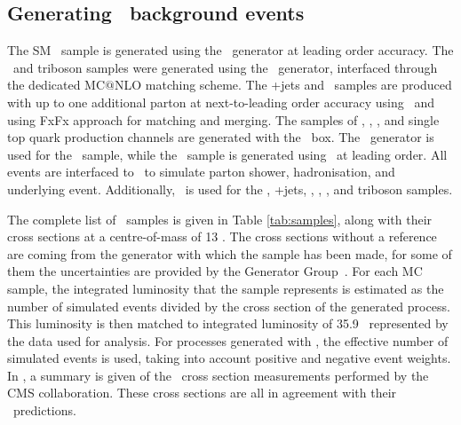\newpage
\subsection{Generating \SM\  background events}

The SM \tZq\ sample is generated using the \aMCMG\ generator at leading order accuracy. The \ttZ\ and triboson samples were generated using the \aMCMG\ generator, interfaced through the dedicated MC${@}$NLO matching scheme. The \WZ+jets and \ttW\ samples are produced with up to one additional parton at next-to-leading order accuracy using \aMCMG\ and using FxFx approach for matching and merging. The samples of \ttH, \WW, \ZZ,  and single top quark  production channels are generated with the \Powheg\ box. The \JHU\ generator is used for the \tqH\ sample, while the \tWZ\ sample is generated using \aMCMG\ at leading order. All events are interfaced to \Pythia\ to simulate parton shower, hadronisation, and underlying event. Additionally, \MS\ is used for the \tZq, \WZ+jets, \ttZ, \ttW, \tWZ, and triboson samples.



The complete list of \SM\ samples is given in Table \ref{tab:samples}, along with their cross sections at a centre-of-mass of 13 \TeV. The cross sections without a reference are coming from the generator with which the sample has been made, for some of them the uncertainties are provided by the Generator Group~\cite{generator}. For each MC sample, the integrated luminosity that the sample represents is estimated as the number of simulated events divided by the cross section of the generated process. This luminosity is then matched to integrated luminosity of 35.9 \fbinv\ represented by the data used for analysis.  For processes generated with \aMCMG, the effective number of simulated events is used, taking into account positive and negative event weights. %
In , a summary is given of the \SM\ cross section measurements performed by the CMS collaboration. These cross sections are all in agreement with their \SM\ predictions. 


